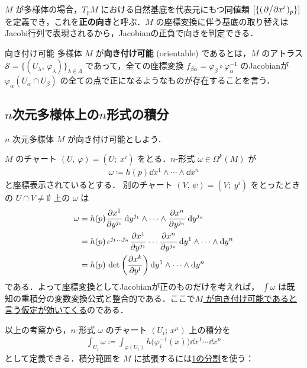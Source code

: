 \documentclass[geometry_main]{subfiles}
\begin{document}
$M$ が\cinfty 多様体の場合，$T_pM$ における自然基底を代表元にもつ同値類 $[\{(\pdv*{}{x^i})_p\}]$ を定義でき，これを\textbf{正の向き}と呼ぶ．$M$ の座標変換に伴う基底の取り替えはJacobi行列で表現されるから，Jacobianの正負で向きを判定できる．

\begin{mydef}[label=def.orientable]{向き付け可能} 
	\cinfty 多様体 $M$ が\textbf{向き付け可能} (orientable) であるとは，$M$ のアトラス $\mathcal{S} = \{(U_\lambda,\, \varphi_\lambda)\}_{\lambda \in \Lambda}$ であって，全ての座標変換 $f_{\beta \alpha} = \varphi_{\beta} \circ \varphi_{\alpha}^{-1}$ のJacobianが $\varphi_{\alpha}(U_\alpha \cap U_\beta)$ の全ての点で正になるようなものが存在することを言う．
\end{mydef}

\subsection{$n$次元多様体上の$n$形式の積分}

$n$ 次元\cinfty 多様体 $M$ が向き付け可能としよう．

$M$ のチャート $(U,\, \varphi) = (U;\; x^i)$ をとる．$n$-形式 $\omega \in \Omega^k(M)$ が
\begin{align} 
	\omega \coloneqq h(p) \dd{x^1} \wedge \cdots \wedge \dd{x^n}
\end{align}
と座標表示されているとする．
別のチャート $(V,\, \psi) = (V;\; y^i)$ をとったときの $U \cap V \neq \emptyset$ 上の $\omega$ は
\begin{align} 
	\omega &= h(p) \pdv{x^1}{y^{j_1}}\dd{y^{j_1}} \wedge \cdots \wedge \pdv{x^n}{y^{j_n}}\dd{y^{j_n}} \\
	&=  h(p)\, \epsilon^{j_1 \dots j_n} \pdv{x^1}{y^{j_1}} \cdots \pdv{x^n}{y^{j_n}} \dd{y^1} \wedge \cdots \wedge \dd{y^n} \\
	&= h(p)\, \det \left( \pdv{x^k}{y^{l}} \right) \dd{y^1} \wedge \cdots \wedge \dd{y^n}
\end{align}
である．よって座標変換としてJacobianが正のものだけを考えれば， $\displaystyle \int \omega$ は既知の重積分の変数変換公式と整合的である．ここで\underline{$M$ が向き付け可能であると言う仮定が効いてくる}のである．

以上の考察から，$n$-形式 $\omega$ のチャート $(U_i;\, x^\mu)$ 上の積分を
\begin{align} 
	\int_{U_i} \omega \coloneqq \int_{\varphi(U_i)} h\bigl(\varphi^{-1}_i (x)\bigr) \dd{x^1} \cdots \dd{x^n}
\end{align}
として定義できる．積分範囲を $M$ に拡張するには\hyperref[partition_unity]{1の分割}を使う：
\end{document}
